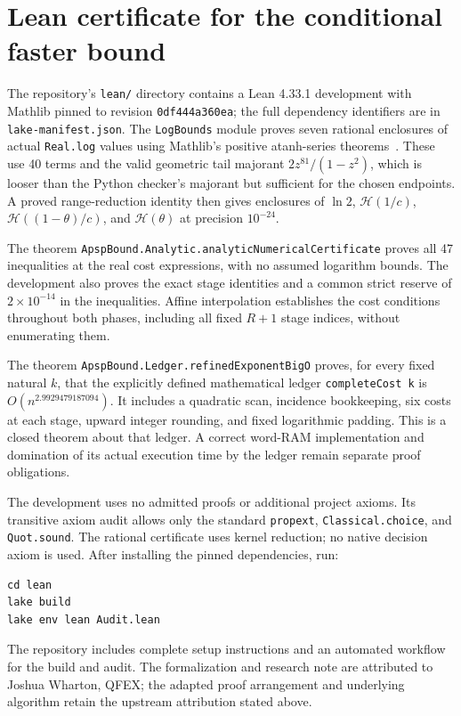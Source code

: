 \documentclass[11pt,a4paper]{article}
\newcommand{\HH}{\mathcal H}
\begin{document}
\section{Lean certificate for the conditional faster bound}\label{sec:lean}
The repository's \texttt{lean/} directory contains a Lean 4.33.1
development with Mathlib pinned to revision \texttt{0df444a360ea};
the full dependency identifiers are in \texttt{lake-manifest.json}.
The \texttt{LogBounds} module proves seven rational enclosures of actual
\texttt{Real.log} values using Mathlib's positive atanh-series
theorems~\cite{mathlib}. These use 40 terms and the valid geometric
tail majorant $2z^{81}/(1-z^2)$, which is looser than the Python checker's
majorant but sufficient for the chosen endpoints. A proved range-reduction
identity then gives enclosures of $\ln2$, $\HH(1/c)$,
$\HH((1-\theta)/c)$, and $\HH(\theta)$ at precision $10^{-24}$.

The theorem \texttt{ApspBound.Analytic.analyticNumericalCertificate}
proves all 47 inequalities at the real cost expressions, with no assumed
logarithm bounds. The development also proves the exact stage identities
and a common strict reserve of $2\times10^{-14}$ in the inequalities.
Affine interpolation establishes the cost conditions throughout both
phases, including all fixed $R+1$ stage indices, without enumerating them.

The theorem \texttt{ApspBound.Ledger.refinedExponentBigO} proves, for
every fixed natural $k$, that the explicitly defined mathematical ledger
\texttt{completeCost k} is $O(n^{2.9929479187094})$. It includes a quadratic
scan, incidence bookkeeping, six costs at each stage, upward integer
rounding, and fixed logarithmic padding. This is a closed theorem about
that ledger. A correct word-RAM implementation and domination of its
actual execution time by the ledger remain separate proof obligations.

The development uses no admitted proofs or additional project axioms.
Its transitive axiom audit allows only the standard
\texttt{propext}, \texttt{Classical.choice}, and \texttt{Quot.sound}.
The rational certificate uses kernel reduction; no native decision axiom
is used. After installing the pinned dependencies, run:
\begin{verbatim}
cd lean
lake build
lake env lean Audit.lean
\end{verbatim}
The repository includes complete setup instructions and an automated
workflow for the build and audit. The formalization and research note
are attributed to Joshua Wharton, QFEX; the adapted proof arrangement
and underlying algorithm retain the upstream attribution stated above.
\end{document}
